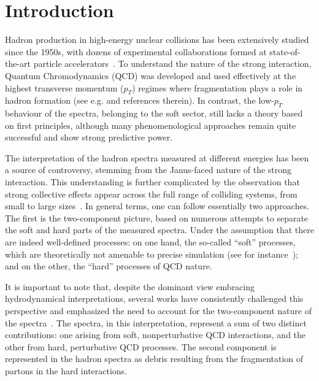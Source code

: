 \documentclass[pdflatex,sn-mathphys-num]{sn-jnl}%
\begin{document}
\maketitle

\section{Introduction}
Hadron production in high-energy nuclear collisions has been extensively studied since the 1950s, with dozens of experimental collaborations formed at state-of-the-art particle accelerators~\cite{Evans:2008zzb}. To understand the nature of the strong interaction, Quantum Chromodynamics (QCD) was developed and used effectively at the highest transverse momentum ($p_T$) regimes where fragmentation plays a role in hadron formation (see e.g. \cite{ALICE:2022wpn} and references therein). In contrast, the low-$p_T$ behaviour of the spectra, belonging to the soft sector, still lacks a theory based on first principles, although many phenomenological approaches remain quite successful and show strong predictive power.


The interpretation of the hadron spectra measured at different energies has been a source of controversy, stemming from the Janus-faced nature of the strong interaction. This understanding is further complicated by the observation that strong collective effects appear across the full range of colliding systems, from small to large sizes~\cite{STRICKLAND201992}. In general terms, one can follow essentially two approaches. The first is the two-component picture, based on numerous attempts to separate the soft and hard parts of the measured spectra. Under the assumption that there are indeed well-defined processes: on one hand, the so-called ``soft'' processes, which are theoretically not amenable to precise simulation (see for instance~\cite{UA2:1987hpe, Wang:1988bw, Ceradini:1985vm}); and on the other, the ``hard'' processes of QCD nature.

It is important to note that, despite the dominant view embracing hydrodynamical interpretations, several works have consistently challenged this perspective and emphasized the need to account for the two-component nature of the spectra~\cite{Trainor:2018dfp, Trainor:2018hkw, Trainor:2022pob}. The spectra, in this interpretation, represent a sum of two distinct contributions: one arising from soft, nonperturbative QCD interactions, and the other from hard, perturbative QCD processes. The second component is represented in the hadron spectra as debris resulting from the fragmentation of partons in the hard interactions. 
\end{document}
